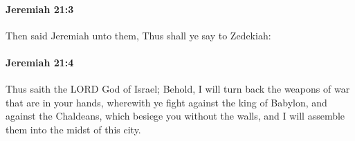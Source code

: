 		\paragraph{Jeremiah 21:3} %
			\label{JEREMIAH-21-3}

			Then said Jeremiah unto them, Thus shall ye say to Zedekiah:


		\paragraph{Jeremiah 21:4} %
			\label{JEREMIAH-21-4}

			Thus saith the LORD God of Israel; Behold, I will turn back the weapons of war that are in your hands, wherewith ye fight against the king of Babylon, and against the Chaldeans, which besiege you without the walls, and I will assemble them into the midst of this city.


